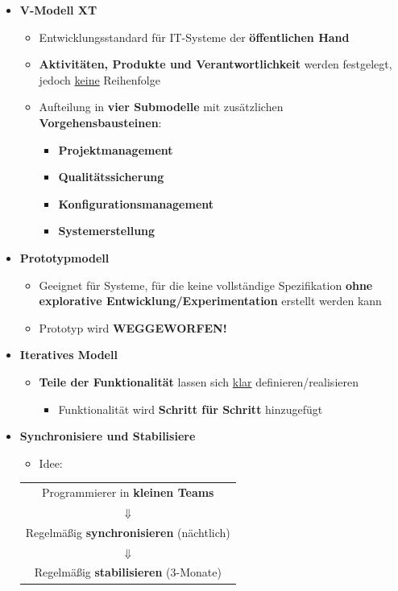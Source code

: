 \newpage
\begin{itemize}
\item \textbf{V-Modell XT}
\begin{itemize}
\item Entwicklungsstandard für IT-Systeme der \textbf{öffentlichen Hand}
\item \textbf{Aktivitäten, Produkte und Verantwortlichkeit} werden festgelegt, jedoch \underline{keine} Reihenfolge
\item Aufteilung in \textbf{vier Submodelle} mit zusätzlichen \textbf{Vorgehensbausteinen}:
\begin{itemize}
\item \textbf{Projektmanagement}
\item \textbf{Qualitätssicherung}
\item \textbf{Konfigurationsmanagement}
\item \textbf{Systemerstellung}
\end{itemize}
\end{itemize}
\item \textbf{Prototypmodell}
\begin{itemize}
\item Geeignet für Systeme, für die keine vollständige Spezifikation \textbf{ohne explorative Entwicklung/Experimentation} erstellt werden kann
\item Prototyp wird \textbf{WEGGEWORFEN!}
\end{itemize}
\item \textbf{Iteratives Modell}
\begin{itemize}
\item \textbf{Teile der Funktionalität} lassen sich \underline{klar} definieren/realisieren
\begin{itemize}
\item Funktionalität wird \textbf{Schritt für Schritt} hinzugefügt
\end{itemize}
\end{itemize}
\item \textbf{Synchronisiere und Stabilisiere}
\begin{itemize}
\item Idee:
\end{itemize}
			
\begin{center}
\begin{tabular}{c}
Programmierer in \textbf{kleinen Teams} \\
$\Downarrow$ \\
Regelmäßig \textbf{synchronisieren} (nächtlich) \\
$\Downarrow$ \\
Regelmäßig \textbf{stabilisieren} (3-Monate) \\
\end{tabular}
\end{center}
			

\end{itemize}
